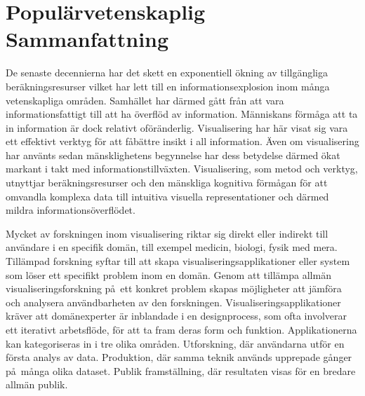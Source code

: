 \chapter*{Popul\"arvetenskaplig Sammanfattning}

De senaste decennierna har det skett en exponentiell \"okning av tillg\"angliga ber\"akningsresurser vilket har lett till en informationsexplosion inom m\aa nga vetenskapliga omr\aa den.  Samh\"allet har d\"armed g\aa tt fr\aa n att vara informationsfattigt till att ha \"overfl\"od av information.  M\"anniskans f\"orm\aa ga att ta in information \"ar dock relativt of\"or\"anderlig.  Visualisering har h\"ar visat sig vara ett effektivt verktyg f\"or att f\aa b\"attre insikt i all information.  \"Aven om visualisering har anv\"ants sedan m\"ansklighetens begynnelse har dess betydelse d\"armed \"okat markant i takt med informationstillv\"axten.  Visualisering, som metod och verktyg, utnyttjar ber\"akningsresurser och den m\"anskliga kognitiva f\"orm\aa gan f\"or att omvandla komplexa data till intuitiva visuella representationer och d\"armed mildra informations\"overfl\"odet.

Mycket av forskningen inom visualisering riktar sig direkt eller indirekt till anv\"andare i en specifik dom\"an, till exempel medicin, biologi, fysik med mera.  Till\"ampad forskning syftar till att skapa visualiseringsapplikationer eller system som l\"oser ett specifikt problem inom en dom\"an.  Genom att till\"ampa allm\"an visualiseringsforskning p\aa\ ett konkret problem skapas m\"ojligheter att j\"amf\"ora och analysera anv\"andbarheten av den forskningen.  Visualiseringsapplikationer kr\"aver att dom\"anexperter \"ar inblandade i en designprocess, som ofta involverar ett iterativt arbetsfl\"ode, f\"or att ta fram deras form och funktion.  Applikationerna kan kategoriseras in i tre olika omr\aa den. Utforskning, d\"ar anv\"andarna utf\"or en f\"orsta analys av data.  Produktion, d\"ar samma teknik anv\"ands upprepade g\aa nger p\aa\ m\aa nga olika dataset.  Publik framst\"allning, d\"ar resultaten visas f\"or en bredare allm\"an publik.

